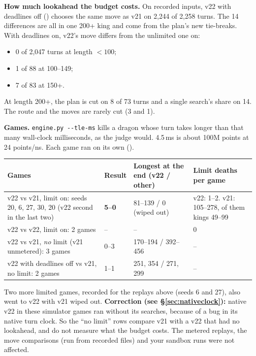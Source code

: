 \documentclass[11pt,a4paper]{article}
\newcommand{\code}[1]{\texttt{\detokenize{#1}}}
\begin{document}
\textbf{How much lookahead the budget costs.} On recorded inputs, v22 with deadlines off (\code{BOT_UNLIMITED}) chooses
the same move as v21 on 2,244 of 2,258 turns. The 14 differences are all in one 200+ king and come from the plan's new
tie-breaks. With deadlines on, v22's move differs from the unlimited one on:
\begin{itemize}
      \item 0 of 2,047 turns at length $<100$;
      \item 1 of 88 at 100--149;
      \item 7 of 83 at 150+.
\end{itemize}
At length 200+, the plan is cut on 8 of 73 turns and a single search's share on 14. The route and the moves are rarely cut
(3 and 1).

\textbf{Games.} \texttt{engine.py -{}-tle-ms} kills a dragon whose turn takes longer than that many wall-clock milliseconds, as the
judge would. 4.5\,ms is about 100M points at 24 points/ns. Each game ran on its own (\code{ab_tle.sh}).
\begin{center}
      \begin{tabular}{@{}>{\raggedright}p{4.6cm}>{\raggedright}p{1.3cm}>{\raggedright}p{3.6cm}p{5.4cm}@{}}
            \toprule
            Games                                                                      & Result        & Longest at the end (v22 / other) & Limit deaths per game \\
            \midrule
            v22 vs v21, limit on: seeds 20, 6, 27, 30, 20 (v22 second in the last two) & \textbf{5--0} & 81--139 / 0 (wiped out)          &
            v22: 1--2. v21: 105--278, of them kings 49--99                                                                                                        \\
            v22 vs v22, limit on: 2 games                                              & --            & --                               & 0                     \\
            v22 vs v21, \emph{no} limit (v21 unmetered): 3 games                       & 0--3          & 170--194 / 392--456              & --                    \\
            v22 with deadlines off vs v21, no limit: 2 games                           & 1--1          & 251, 354 / 271, 299              & --                    \\
            \bottomrule
      \end{tabular}
\end{center}
Two more limited games, recorded for the replays above (seeds 6 and 27), also went to v22 with v21 wiped out.
\textbf{Correction (see \S\ref{sec:nativeclock}):} native v22 in these simulator games ran without its searches, because
of a bug in its native turn clock. So the ``no limit'' rows compare v21 with a v22 that had no lookahead, and do not measure
what the budget costs. The metered replays, the move comparisons (run from recorded files) and your sandbox runs were not
affected.
\end{document}
